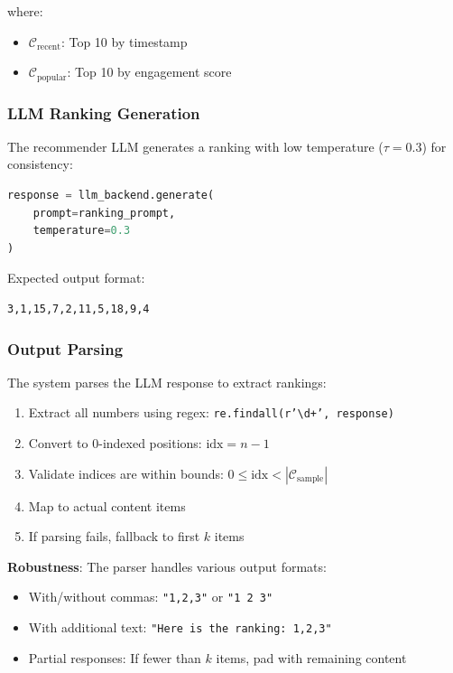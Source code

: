 \documentclass[11pt]{article}
\begin{document}
where:
\begin{itemize}
    \item $\mathcal{C}_{\text{recent}}$: Top 10 by timestamp
    \item $\mathcal{C}_{\text{popular}}$: Top 10 by engagement score
\end{itemize}

\subsubsection{LLM Ranking Generation}

The recommender LLM generates a ranking with low temperature ($\tau = 0.3$) for consistency:

\begin{lstlisting}[language=Python, basicstyle=\small\ttfamily]
response = llm_backend.generate(
    prompt=ranking_prompt,
    temperature=0.3
)
\end{lstlisting}

Expected output format:
\begin{lstlisting}[basicstyle=\small\ttfamily]
3,1,15,7,2,11,5,18,9,4
\end{lstlisting}

\subsubsection{Output Parsing}

The system parses the LLM response to extract rankings:

\begin{enumerate}
    \item Extract all numbers using regex: \texttt{re.findall(r'\textbackslash d+', response)}
    \item Convert to 0-indexed positions: $\text{idx} = n - 1$
    \item Validate indices are within bounds: $0 \leq \text{idx} < |\mathcal{C}_{\text{sample}}|$
    \item Map to actual content items
    \item If parsing fails, fallback to first $k$ items
\end{enumerate}

\textbf{Robustness}: The parser handles various output formats:
\begin{itemize}
    \item With/without commas: \texttt{"1,2,3"} or \texttt{"1 2 3"}
    \item With additional text: \texttt{"Here is the ranking: 1,2,3"}
    \item Partial responses: If fewer than $k$ items, pad with remaining content
\end{itemize}
\end{document}
